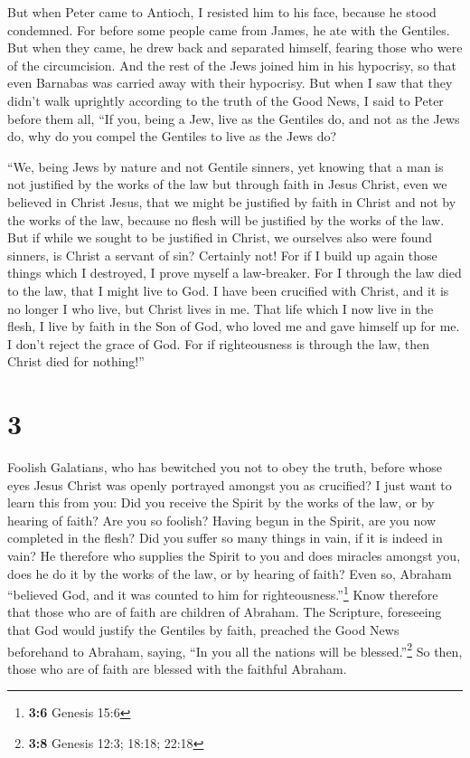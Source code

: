  But when Peter came to Antioch, I resisted him to his
face, because he stood condemned.  For before some people
came from James, he ate with the Gentiles. But when they came, he drew
back and separated himself, fearing those who were of the circumcision.
 And the rest of the Jews joined him in his hypocrisy, so
that even Barnabas was carried away with their hypocrisy.
 But when I saw that they didn't walk uprightly according
to the truth of the Good News, I said to Peter before them all, ``If
you, being a Jew, live as the Gentiles do, and not as the Jews do, why
do you compel the Gentiles to live as the Jews do?

 ``We, being Jews by nature and not Gentile sinners,
 yet knowing that a man is not justified by the works of
the law but through faith in Jesus Christ, even we believed in Christ
Jesus, that we might be justified by faith in Christ and not by the
works of the law, because no flesh will be justified by the works of the
law.  But if while we sought to be justified in Christ,
we ourselves also were found sinners, is Christ a servant of sin?
Certainly not!  For if I build up again those things
which I destroyed, I prove myself a law-breaker.  For I
through the law died to the law, that I might live to God.
 I have been crucified with Christ, and it is no longer I
who live, but Christ lives in me. That life which I now live in the
flesh, I live by faith in the Son of God, who loved me and gave himself
up for me.  I don't reject the grace of God. For if
righteousness is through the law, then Christ died for nothing!''

\hypertarget{section-2}{%
\section{3}\label{section-2}}

 Foolish Galatians, who has bewitched you not to obey the
truth, before whose eyes Jesus Christ was openly portrayed amongst you
as crucified?  I just want to learn this from you: Did you
receive the Spirit by the works of the law, or by hearing of faith?
 Are you so foolish? Having begun in the Spirit, are you
now completed in the flesh?  Did you suffer so many things
in vain, if it is indeed in vain?  He therefore who
supplies the Spirit to you and does miracles amongst you, does he do it
by the works of the law, or by hearing of faith?  Even so,
Abraham ``believed God, and it was counted to him for
righteousness.''\footnote{\textbf{3:6} Genesis 15:6}  Know
therefore that those who are of faith are children of Abraham.
 The Scripture, foreseeing that God would justify the
Gentiles by faith, preached the Good News beforehand to Abraham, saying,
``In you all the nations will be blessed.''\footnote{\textbf{3:8}
  Genesis 12:3; 18:18; 22:18}  So then, those who are of
faith are blessed with the faithful Abraham.

